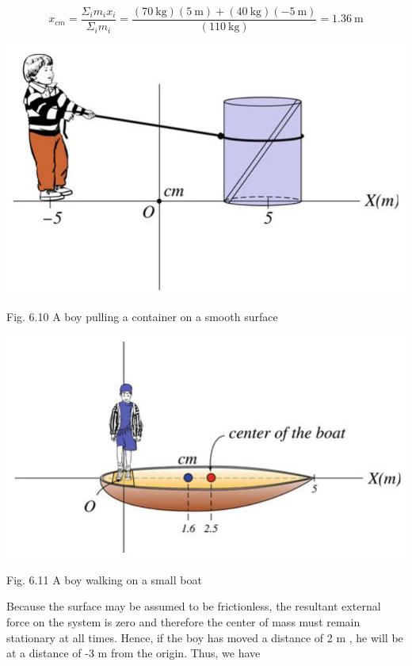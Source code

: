 \documentclass[10pt]{article}
\begin{document}
$$
x_{c m}=\frac{\Sigma_{i} m_{i} x_{i}}{\Sigma_{i} m_{i}}=\frac{(70 \mathrm{~kg})(5 \mathrm{~m})+(40 \mathrm{~kg})(-5 \mathrm{~m})}{(110 \mathrm{~kg})}=1.36 \mathrm{~m}
$$

\begin{center}
\includegraphics[max width=\textwidth]{2024_09_13_db1f357d2aad0a03eb2eg-099(1)}
\end{center}

Fig. 6.10 A boy pulling a container on a smooth surface

\begin{center}
\includegraphics[max width=\textwidth]{2024_09_13_db1f357d2aad0a03eb2eg-100}
\end{center}

Fig. 6.11 A boy walking on a small boat

Because the surface may be assumed to be frictionless, the resultant external force on the system is zero and therefore the center of mass must remain stationary at all times. Hence, if the boy has moved a distance of 2 m , he will be at a distance of -3 m from the origin. Thus, we have
\end{document}
